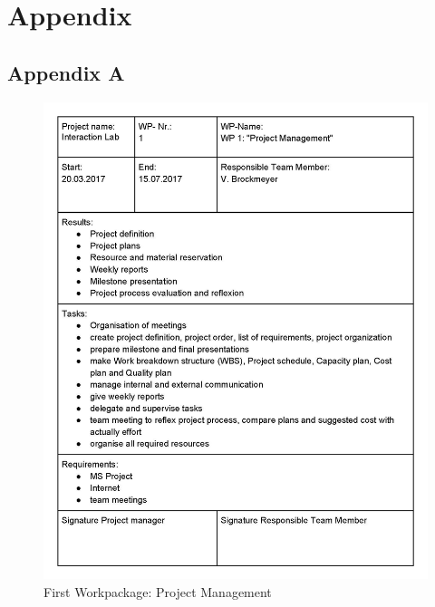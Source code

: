 \section{Appendix}
\subsection{Appendix A} \label{sec:AppendixA}
\begin{figure}[H] 
	\center 
	\includegraphics[width= 16 cm]{Images/Workpackages_Seite_1.jpg}			
	\caption[]{First Workpackage: Project Management}
	\label{fig:Workpackage1}
\end{figure} 
\newpage
